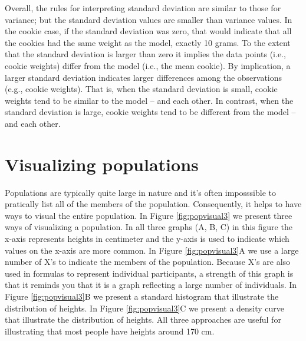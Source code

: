 \documentclass[
]{krantz}
\begin{document}
Overall, the rules for interpreting standard deviation are similar to those for variance; but the standard deviation values are smaller than variance values. In the cookie case, if the standard deviation was zero, that would indicate that all the cookies had the same weight as the model, exactly 10 grams. To the extent that the standard deviation is larger than zero it implies the data points (i.e., cookie weights) differ from the model (i.e., the mean cookie). By implication, a larger standard deviation indicates larger differences among the observations (e.g., cookie weights). That is, when the standard deviation is small, cookie weights tend to be similar to the model -- and each other. In contrast, when the standard deviation is large, cookie weights tend to be different from the model -- and each other.

\hypertarget{visualizing-populations}{%
\section{Visualizing populations}\label{visualizing-populations}}

Populations are typically quite large in nature and it's often imposssible to pratically list all of the members of the population. Consequently, it helps to have ways to visual the entire population. In Figure \ref{fig:popvisual3} we present three ways of visualizing a population. In all three graphs (A, B, C) in this figure the x-axis represents heights in centimeter and the y-axis is used to indicate which values on the x-axis are more common. In Figure \ref{fig:popvisual3}A we use a large number of X's to indicate the members of the population. Because X's are also used in formulas to represent individual participants, a strength of this graph is that it reminds you that it is a graph reflecting a large number of individuals. In Figure \ref{fig:popvisual3}B we present a standard histogram that illustrate the distribution of heights. In Figure \ref{fig:popvisual3}C we present a density curve that illustrate the distribution of heights. All three approaches are useful for illustrating that most people have heights around 170 cm.
\end{document}
